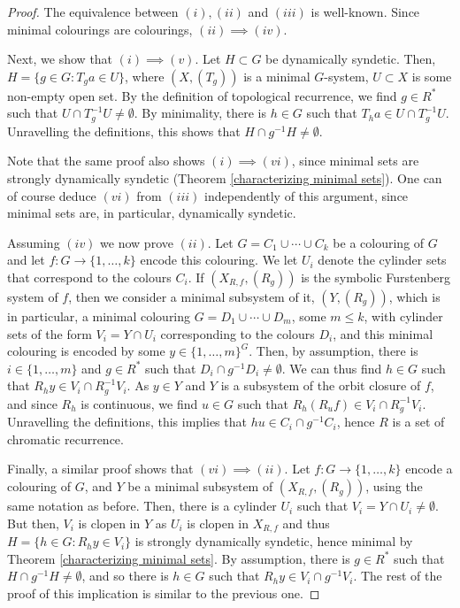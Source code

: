 \documentclass{amsart}
\numberwithin{equation}{section}
\theoremstyle{definition}
\theoremstyle{plain}
\begin{document}
\begin{proof}
The equivalence between $(i),(ii)$ and $(iii)$ is well-known. Since minimal colourings are colourings, $(ii)\implies (iv)$. 

Next, we show that $(i) \implies (v)$. Let $H\subset G$ be dynamically 
syndetic. Then, $H=\{g\in G: T_ga\in U\}$, where $(X,(T_g))$ is a minimal 
$G$-system, $U\subset X$ is some non-empty open set. By the definition of
topological recurrence, we find $g\in R^{*}$ such that $U\cap T_g^{-1}U \neq \emptyset$. By minimality, there is $h\in G$ such that $T_ha\in U\cap T_g^{-1}U$. Unravelling the definitions, this shows that $H\cap g^{-1}H\neq \emptyset$. 

Note that the same proof also shows $(i)\implies (vi)$, since minimal sets 
are strongly dynamically syndetic (Theorem \ref{characterizing minimal sets}). One 
can of course deduce $(vi)$ from $(iii)$ independently of this argument, since minimal sets are, in particular, dynamically syndetic. 

Assuming $(iv)$ we now prove $(ii)$. Let $G=C_1\cup \cdots \cup C_k$ be a colouring of $G$ and let $f:G\to \{1,\ldots,k\}$ encode this colouring. We let $U_i$ denote the cylinder sets that correspond to the colours $C_i$. If $(X_{R,f},(R_g))$ is the symbolic Furstenberg system of $f$, then we consider a minimal subsystem of it, $(Y,(R_g))$, which is in particular, a minimal colouring $G=D_1 \cup \cdots \cup D_m$, some $m\leq k$, with cylinder sets of the form $V_i=Y\cap U_i$ corresponding to the colours $D_i$, and this minimal colouring is encoded by some $y\in \{1,\ldots,m\}^G$. Then, by assumption, there is $i\in \{1,\ldots,m\}$ and $g\in R^{*}$ such that $D_i \cap g^{-1}D_i \neq \emptyset$. We can thus find $h\in G$ such that $R_hy \in V_i \cap R_{g}^{-1}V_i$. As $y\in Y$ and $Y$ is a subsystem of the orbit closure of $f$, and since $R_h$ is continuous, we find $u\in G$ such that $R_h(R_uf)\in V_i \cap R_{g}^{-1}V_i$. Unravelling the definitions, this implies that $hu \in C_i\cap g^{-1}C_i$, hence $R$ is a set of chromatic recurrence. 

Finally, a similar proof shows that $(vi)\implies (ii)$. Let $f:G\to \{1,\ldots,k\}$ encode a colouring of $G$, and $Y$ be a minimal subsystem of $(X_{R,f},(R_g))$, using the same notation as before. Then, there is a cylinder $U_i$ such that $V_i=Y\cap U_i\neq \emptyset$. But then, $V_i$ is clopen in $Y$ as $U_i$ is clopen in $X_{R,f}$ and thus $H=\{h\in G: R_hy \in V_i\}$ is strongly dynamically syndetic, hence minimal by Theorem \ref{characterizing minimal sets}. By assumption, there is $g\in R^{*}$ such that $H\cap g^{-1}H\neq \emptyset$, and so there is $h\in G$ such that $R_hy\in V_i \cap g^{-1}V_i$. The rest of the proof of this implication is similar to the previous one. 
\end{proof}
\end{document}
